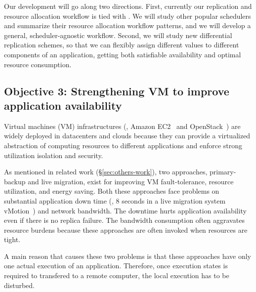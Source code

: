 
 Our \tripod development will go along two directions. 
First, currently our replication and resource allocation workflow is tied with 
\mesos. We will study other popular schedulers and summarize their 
resource allocation workflow patterns, and we will develop a general, 
scheduler-agnostic workflow. Second, we will study new differential replication 
schemes, so that we can flexibly assign different  values to different 
components of an application, getting both satisfiable availability and optimal 
resource consumption.

\vspace{-.15in}\subsection{Objective 3: Strengthening VM to improve application 
availability}\label{sec:vm}\vspace{-.075in}




Virtual machines (VM) infrastructures (\eg, Amazon EC2~\cite{amazon:vpc} and 
OpenStack~\cite{openstack}) are widely deployed in datacenters and clouds 
because they can provide a virtualized abstraction of computing resources to 
different applications and enforce strong utilization isolation and security. 

As mentioned in related work (\S\ref{sec:others-work}), two approaches, 
primary-backup and live migration, exist for improving VM fault-tolerance, 
resource utilization, and energy saving. Both these approaches face problems on 
substantial application down time (\eg, 8 seconds in a live migration system 
vMotion~\cite{vmotion:atc05}) and network bandwidth. The downtime hurts 
application availability even if there is no replica failure. The bandwidth 
consumption often aggravates resource burdens because these approaches are often 
invoked when resources are tight.

A main reason that causes these two problems is that these approaches have only 
one actual execution of an application. Therefore, once execution states is 
required to transfered to a remote computer, the local execution has to be 
disturbed.


